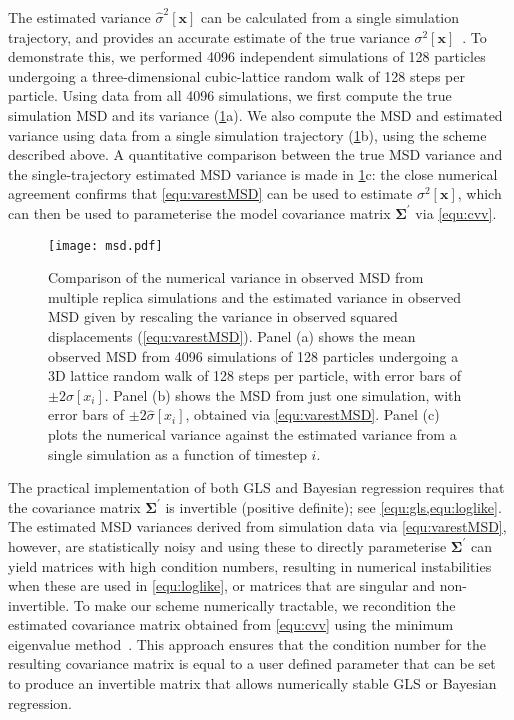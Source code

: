 \documentclass[reprint,superscriptaddress,nobibnotes,amsmath,amssymb,aps,prx,hidelinks]{revtex4-2}
\newcommand{\oMSD}{\ensuremath{\bm{x}}}
\newcommand{\oMSDi}{\ensuremath{x_i}}
\newcommand{\var}[1]{\ensuremath{\sigma^2[#1]}}
\newcommand{\varest}[1]{\ensuremath{\widehat{\sigma}^2[#1]}}
\begin{document}
The estimated variance $\varest{\oMSD}$ can be calculated from a single simulation trajectory, and provides an accurate estimate of the true variance $\var{\oMSD}$~\cite{Note2,FlyvbjergAndPetersen_JChemPhys1989,Frenkel2023-ah}.
To demonstrate this, we performed \num{4096} independent simulations of \num{128} particles undergoing a three-dimensional cubic-lattice random walk of \num{128} steps per particle.
Using data from all \num{4096} simulations, we first compute the true simulation MSD and its variance (\cref{fig:msd}a).
We also compute the MSD and estimated variance using data from a single simulation trajectory (\cref{fig:msd}b), using the scheme described above.
A quantitative comparison between the true MSD variance and the single-trajectory estimated MSD variance is made in \cref{fig:msd}c: the close numerical agreement confirms that \cref{equ:varestMSD} can be used to estimate $\var{\oMSD}$, which can then be used to parameterise the model covariance matrix $\mathbf{\Sigma^\prime}$ via \cref{equ:cvv}.
\begin{figure}
    \centering
    \texttt{[image: msd.pdf]}
    \caption{
        Comparison of the numerical variance in observed MSD from multiple replica simulations and the estimated variance in observed MSD given by rescaling the variance in observed squared displacements (\cref{equ:varestMSD}).
        Panel (a) shows the mean observed MSD from \num{4096} simulations of \num{128} particles undergoing a 3D lattice random walk of \num{128} steps per particle, with error bars of $\pm2\sigma[\oMSDi]$.
        Panel (b) shows the MSD from just one simulation, with error bars of $\pm2\widehat{\sigma}[\oMSDi]$, obtained via \cref{equ:varestMSD}.
        Panel (c) plots the numerical variance against the estimated variance from a single simulation as a function of timestep $i$.
    }
    \label{fig:msd}
\end{figure}

The practical implementation of both GLS and Bayesian regression requires that the covariance matrix $\mathbf{\Sigma^\prime}$ is invertible (positive definite); see \cref{equ:gls,equ:loglike}.
The estimated MSD variances derived from simulation data via \cref{equ:varestMSD}, however, are statistically noisy and using these to directly parameterise $\mathbf{\Sigma^\prime}$ can yield matrices with high condition numbers, resulting in numerical instabilities when these are used in \cref{equ:loglike}, or matrices that are singular and non-invertible.
To make our scheme numerically tractable, we recondition the estimated covariance matrix obtained from \cref{equ:cvv} using the minimum eigenvalue method~\cite{TabeartEtAl_TellusDynMeteorolOceanogr2020}.
This approach ensures that the condition number for the resulting covariance matrix is equal to a user defined parameter that can be set to produce an invertible matrix that allows numerically stable GLS or Bayesian regression.
\end{document}
